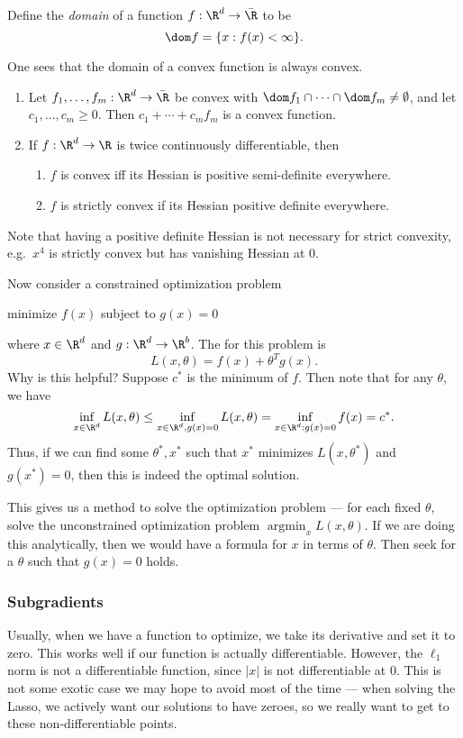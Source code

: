 \documentclass[a4paper]{article}
\DeclareMathOperator*\argmin{argmin}
\begin{document}
\begin{defi}[Domain]
  Define the \emph{domain} of a function $f: \R^d \to \bar{\R}$ to be
  \[
    \dom f = \{x : f(x) < \infty\}.
  \]
\end{defi}
One sees that the domain of a convex function is always convex.

\begin{prop}\leavevmode
  \begin{enumerate}
    \item Let $f_1, \ldots, f_m: \R^d \to \bar{\R}$ be convex with $\dom f_1 \cap \cdots \cap \dom f_m \not = \emptyset$, and let $c_1, \ldots, c_m \geq 0$. Then $c_1 + \cdots + c_m f_m$ is a convex function.
    \item If $f: \R^d \to \R$ is twice continuously differentiable, then
      \begin{enumerate}
        \item $f$ is convex iff its Hessian is positive semi-definite everywhere.
        \item $f$ is strictly convex if its Hessian positive definite everywhere.\fakeqed
      \end{enumerate}
  \end{enumerate}
\end{prop}
Note that having a positive definite Hessian is not necessary for strict convexity, e.g.\ $x^4$ is strictly convex but has vanishing Hessian at $0$.

Now consider a constrained optimization problem
\begin{center}
  minimize $f(x)$ subject to $g(x) = 0$
\end{center}
where $x \in \R^d$ and $g: \R^d \to \R^b$. The  for this problem is
\[
  L(x, \theta) = f(x) + \theta^T g(x).
\]
Why is this helpful? Suppose $c^*$ is the minimum of $f$. Then note that for any $\theta$, we have
\[
  \inf_{x \in \R^d} L(x, \theta) \leq \inf_{x \in \R^d, g(x) = 0} L(x, \theta) = \inf_{x \in \R^d: g(x) = 0} f(x) = c^*.
\]
Thus, if we can find some $\theta^*, x^*$ such that $x^*$ minimizes $L(x, \theta^*)$ and $g(x^*) = 0$, then this is indeed the optimal solution.

This gives us a method to solve the optimization problem --- for each fixed $\theta$, solve the unconstrained optimization problem $\argmin_x L(x, \theta)$. If we are doing this analytically, then we would have a formula for $x$ in terms of $\theta$. Then seek for a $\theta$ such that $g(x) = 0$ holds.

\subsubsection*{Subgradients}
Usually, when we have a function to optimize, we take its derivative and set it to zero. This works well if our function is actually differentiable. However, the $\ell_1$ norm is not a differentiable function, since $|x|$ is not differentiable at $0$. This is not some exotic case we may hope to avoid most of the time --- when solving the Lasso, we actively want our solutions to have zeroes, so we really want to get to these non-differentiable points.
\end{document}
